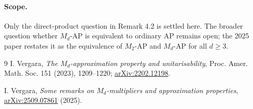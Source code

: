\documentclass[11pt]{article}
\begin{document}
\paragraph{Scope.}
Only the direct-product question in Remark 4.2 is settled here. The broader
question whether $M_d$-AP is equivalent to ordinary AP remains open; the 2025
paper restates it as the equivalence of $M_2$-AP and $M_d$-AP for all
$d\geq3$.

\begin{thebibliography}{9}
I. Vergara,
\emph{The $M_d$-approximation property and unitarisability},
Proc. Amer. Math. Soc. 151 (2023), 1209--1220;
\href{https://arxiv.org/abs/2202.12198}{arXiv:2202.12198}.

I. Vergara,
\emph{Some remarks on $M_d$-multipliers and approximation properties},
\href{https://arxiv.org/abs/2509.07861}{arXiv:2509.07861} (2025).
\end{thebibliography}
\end{document}
